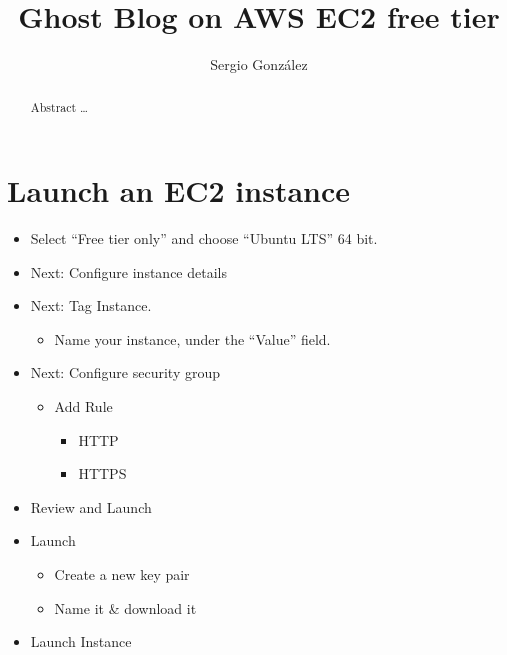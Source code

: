 \documentclass[a4paper]{report}
\title{Ghost Blog on AWS EC2 free tier}
\date{} %
\author{Sergio Gonz\'alez}
\begin{document}
  \maketitle

  \begin{abstract}
    Abstract \ldots
  \end{abstract}

  \tableofcontents

  \section{Launch an EC2 instance}
    \begin{itemize}
      \item Select ``Free tier only'' and choose ``Ubuntu LTS'' 64 bit.
      \item Next: Configure instance details
      \item Next: Tag Instance.
        \begin{itemize}
          \item Name your instance, under the ``Value'' field.
        \end{itemize}
      \item Next: Configure security group
        \begin{itemize}
          \item Add Rule
          \begin{itemize}
            \item HTTP
            \item HTTPS
          \end{itemize}
        \end{itemize}
      \item Review and Launch
      \item Launch
        \begin{itemize}
          \item Create a new key pair
          \item Name it \& download it
        \end{itemize}
      \item Launch Instance
    \end{itemize}
\end{document}
